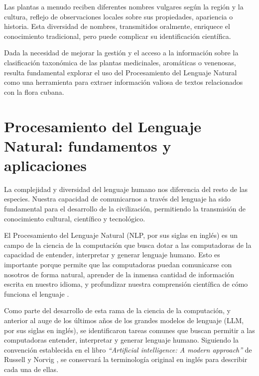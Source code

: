 Las plantas a menudo reciben diferentes nombres vulgares según la región y la 
cultura, reflejo de observaciones locales sobre sus propiedades, apariencia o 
historia. Esta diversidad de nombres, transmitidos oralmente, enriquece el 
conocimiento tradicional, pero puede complicar su identificación científica.

Dada la necesidad de mejorar la gestión y el acceso a la información sobre la clasificación 
taxonómica de las plantas medicinales, aromáticas o venenosas, resulta fundamental explorar 
el uso del Procesamiento del Lenguaje Natural como una herramienta para extraer información 
valiosa de textos relacionados con la flora cubana.

\section{Procesamiento del Lenguaje Natural: fundamentos y aplicaciones}\label{section: nlp}
La complejidad y diversidad del lenguaje humano nos diferencia del resto de las 
especies. Nuestra capacidad de comunicarnos a través del lenguaje ha sido 
fundamental para el desarrollo de la civilización, permitiendo la transmisión de 
conocimiento cultural, científico y tecnológico.

El Procesamiento del Lenguaje Natural (NLP, por sus siglas en inglés) es un campo 
de la ciencia de la computación que busca dotar a las computadoras 
de la capacidad de entender, interpretar y generar lenguaje humano. 
Esto es importante porque permite que las computadoras puedan comunicarse con 
nosotros de forma natural, aprender de la inmensa cantidad de información escrita 
en nuestro idioma, y profundizar nuestra comprensión científica de cómo funciona 
el lenguaje \cite{Russell2020}.

Como parte del desarrollo de esta rama de la ciencia de la computación, y anterior 
al auge de los últimos años de los grandes modelos de lenguaje (LLM, por sus siglas en inglés), 
se identificaron tareas comunes que buscan permitir a las computadoras entender, 
interpretar y generar lenguaje humano. Siguiendo la convención establecida en 
el libro \textit{``Artificial intelligence: A modern approach''} de Russell y Norvig \cite{Russell2020}, 
se conservará la terminología original en inglés para describir cada una de ellas.

